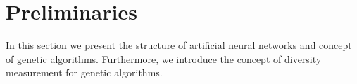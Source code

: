 \section{Preliminaries}
\label{sec:preliminaries}

In this section we present the structure of artificial neural networks and concept of genetic algorithms. Furthermore, we introduce the concept of diversity measurement for genetic algorithms.






